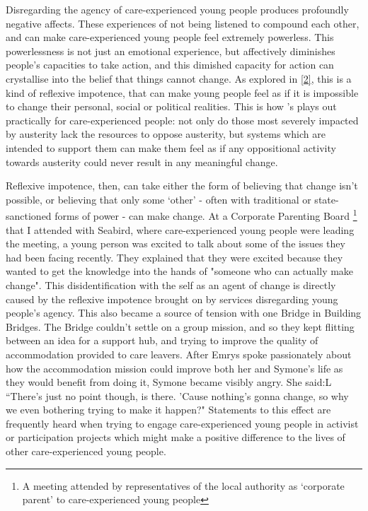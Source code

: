 Disregarding the agency of care-experienced young people produces profoundly negative affects. These experiences of not being listened to compound each other, and can make care-experienced young people feel extremely powerless. This powerlessness is not just an emotional experience, but affectively diminishes people’s capacities to take action, and this dimished capacity for action can crystallise into the belief that things cannot change. As explored in \ref{2}, this is a kind of reflexive impotence, that can make young people feel as if it is impossible to change their personal, social or political realities. This is how \citep{harrison_cant_2020}’s plays out practically for care-experienced people: not only do those most severely impacted by austerity lack the resources to oppose austerity, but systems which are intended to support them can make them feel as if any oppositional activity towards austerity could never result in any meaningful change. 

Reflexive impotence, then, can take either the form of believing that change isn’t possible, or believing that only some ‘other’ - often with traditional or state-sanctioned forms of power - can make change. At a Corporate Parenting Board \footnote{A meeting attended by representatives of the local authority as ‘corporate parent’ to care-experienced young people} that I attended with Seabird, where care-experienced young people were leading the meeting, a young person was excited to talk about some of the issues they had been facing recently. They explained that they were excited because they wanted to get the knowledge into the hands of "someone who can actually make change".  This disidentification with the self as an agent of change is directly caused by the reflexive impotence brought on by services disregarding young people’s agency. This also became a source of tension with one Bridge in Building Bridges. The Bridge couldn’t settle on a  group mission, and so they kept flitting between an idea for a support hub, and  trying to improve the quality of accommodation provided to care leavers. After Emrys spoke passionately about how the accommodation mission could improve both her and Symone's life as they would benefit from doing it, Symone became visibly angry. She said:L “There's just no point though, is there. 'Cause nothing's gonna change, so why we even bothering trying to make it happen?" Statements to this effect are frequently heard when trying to engage care-experienced young people in activist or participation projects which might make a positive difference to the lives of other care-experienced young people. 

